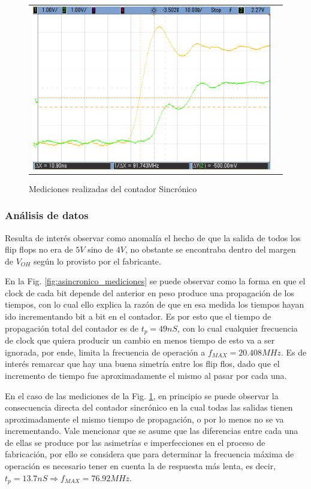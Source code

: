 \begin{figure}[H]
\begin{tabular}{c c}
            \includegraphics[scale=0.2]{../EJ7/Mediciones/Osciloscopio/Sincronico/cropped_salida_q2.png}
        \end{tabular}
    \caption{Mediciones realizadas del contador Sincr\'onico}
    \label{fig:sincronico_mediciones}
\end{figure}

\subsubsection{An\'alisis de datos}
Resulta de inter\'es observar como anomal\'ia el hecho de que la salida de todos los flip flops no era de $5 V$ sino de $4 V$,
no obstante se encontraba dentro del margen de $V_{OH}$ seg\'un lo provisto por el fabricante. 

En la Fig. \ref{fig:asincronico_mediciones} se puede observar como la forma en que el clock de cada bit depende del anterior en peso produce una propagaci\'on de los tiempos, con lo cual ello explica
la raz\'on de que en esa medida los tiempos hayan ido incrementando bit a bit en el contador. Es por esto que el tiempo de propagaci\'on total
del contador es de $t_p = 49nS$, con lo cual cualquier frecuencia de clock que quiera producir un cambio en menos tiempo de esto va a ser ignorada, por ende, limita la frecuencia de operaci\'on a
$f_{MAX} = 20.408MHz$. Es de inter\'es remarcar que hay una buena simetr\'ia entre los flip flos, dado que el incremento de tiempo fue aproximadamente el mismo al pasar por cada una.

En el caso de las mediciones de la Fig. \ref{fig:sincronico_mediciones}, en principio se puede observar la consecuencia directa del contador sincr\'onico en la cual todas las salidas tienen aproximadamente el mismo tiempo de propagaci\'on,
o por lo menos no se va incrementando. Vale mencionar que se asume que las diferencias entre cada una de ellas se produce por las asimetr\'ias e imperfecciones en el proceso de fabricaci\'on, por ello se considera que para determinar la frecuencia
m\'axima de operaci\'on es necesario tener en cuenta la de respuesta m\'as lenta, es decir, $t_p = 13.7nS \Rightarrow f_{MAX} = 76.92MHz$.

